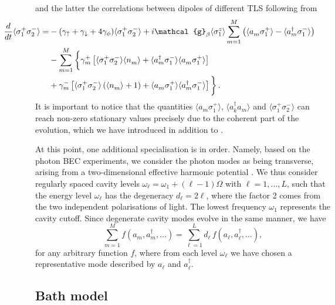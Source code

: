 \documentclass[12pt, a4paper]{iopart}
\newcommand{\avg}[1]{\langle{#1}\rangle}
\begin{document}
%
and the latter the correlations between dipoles of different TLS following from
%
\begin{eqnarray}
\hspace*{-2cm}
\frac{d}{dt}\avg{\sigma^+_1\sigma^-_2}=&-(\gamma_\uparrow+\gamma_\downarrow+{4\gamma_\phi})\avg{\sigma^+_1\sigma^-_2}
+i\mathcal{g}_\beta\avg{\sigma^z_1}\sum_{m=1}^M\left(\avg{a_m^{}\sigma^+_1}-\avg{a^\dag_m\sigma^-_1}\right)\nonumber\\
\hspace*{-2cm}
&-\sum_{m=1}^M\bigg\{\gamma^+_m\left[\avg{\sigma^+_1\sigma^-_2}\avg{n_m^{}}+\avg{a^\dag_m\sigma^-_1}\avg{a_m^{}\sigma^+_1}\right]\nonumber\\
\hspace*{-2cm}
&+\gamma^-_m\left[\avg{\sigma^+_1\sigma^-_2}\left(\avg{n_m^{}}+1\right)+\avg{a_m^{}\sigma^+_1}\avg{a^\dag_m\sigma^-_1}\right]\bigg\}\,.\label{eq:MainSys-5}
\end{eqnarray}
%
It is important to notice that the quantities $\avg{a_m^{}\sigma^+_1}$, $\avg{a_k^\dag a_m^{}}$ and $\avg{\sigma^+_1\sigma^-_2}$ can reach non-zero stationary values precisely due to the coherent part of the evolution, which we have introduced in addition to \cite{Keeling_PRL-nonequilibrium_model_photon-cond,Keeling-Thermalization_photon_condensate}.

At this point, one additional specialisation is in order. Namely, based on the photon BEC experiments, we consider the photon modes as being transverse, arising from a two-dimensional effective harmonic potential \cite{Klaers_BEC_of_photons}. We thus consider regularly spaced cavity levels $\omega_\ell=\omega_1+ (\ell-1)\Omega$ with $\ell=1,\ldots,L$, such that the energy level $\omega_\ell$ has the degeneracy $d_\ell^{}=2\ell$, where the factor 2 comes from the two independent polarisations of light. The lowest frequency $\omega_1$ represents the cavity cutoff. Since degenerate cavity modes evolve in the same manner, we have
%
\begin{equation}
\sum_{m=1}^M f(a^{}_m,a^\dag_m,\ldots)=\sum_{\ell=1}^L d_\ell^{}\, f(a^{}_\ell,a^\dag_\ell,\ldots),
\end{equation}
%
for any arbitrary function $f$, where from each level $\omega_\ell$ we have chosen a representative mode described by $a^{}_\ell$ and $a^\dag_\ell$.

\subsection{Bath model}
\end{document}
